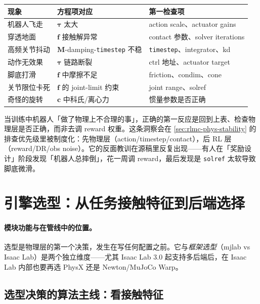 \begin{center}
\small
\begin{tabular}{@{}lll@{}}
\toprule
现象 & 方程项对应 & 第一检查项 \\
\midrule
机器人飞走 & $\boldsymbol\tau$ 太大 & action scale、actuator gains \\
穿透地面 & $\mathbf f$ 接触解异常 & contact 参数、solver iterations \\
高频关节抖动 & $\mathbf{M}$-damping-\verb|timestep| 不稳 & \verb|timestep|、integrator、kd \\
动作无效果 & $\boldsymbol\tau$ 链路断裂 & ctrl 地址、actuator target \\
脚底打滑 & $\mathbf f$ 中摩擦不足 & friction、condim、cone \\
关节限位卡死 & $\mathbf f$ 的 joint-limit 约束 & joint range、solref \\
奇怪的旋转 & $\mathbf c$ 中科氏/离心力 & 惯量参数是否正确 \\
\bottomrule
\end{tabular}
\end{center}

\begin{insight}\label{ins:rlmc-phys-reward}
当训练中机器人「做了物理上不合理的事」，正确的第一反应是回到上表、检查物理层是否正确，而非去调 reward 权重。这条洞察会在 \cref{sec:rlmc-phys-stability} 的排查优先级里被制度化：先物理层（action/timestep/contact），后 RL 层（reward/DR/obs noise）。它的反面教训在源稿里反复出现——有人在「奖励设计」阶段发现「机器人总摔倒」，花一周调 reward，最后发现是 \verb|solref| 太软导致脚底微滑。
\end{insight}

\section{引擎选型：从任务接触特征到后端选择}
\label{sec:rlmc-phys-select}

\paragraph{模块功能与在管线中的位置。}选型是物理层的第一个决策，发生在写任何配置之前。它与\emph{框架选型}（mjlab vs Isaac Lab）是两个独立维度——尤其 Isaac Lab 3.0 起支持多后端后，在 Isaac Lab 内部也要再选 PhysX 还是 Newton/MuJoCo Warp。

\subsection{选型决策的算法主线：看接触特征}

